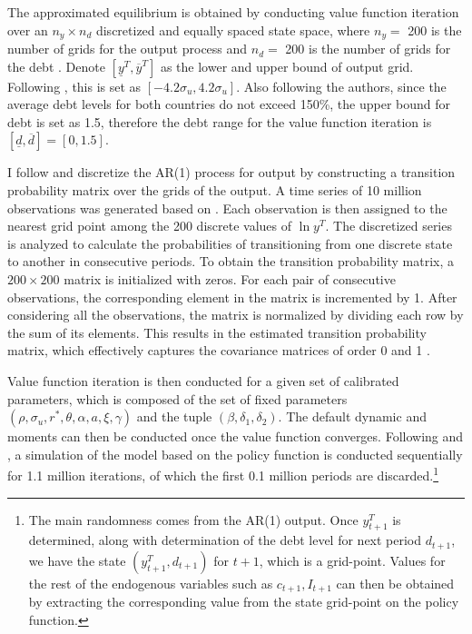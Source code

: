 The approximated equilibrium is obtained by conducting value function iteration over an $n_y \times n_d$ discretized and equally spaced state space,
where $n_y = $ 200 is the number of grids for the output process and $n_d=$ 200 is the number of grids for the debt \citep{Na-18}. Denote $[\underline{y}^T, \overline{y}^T]$ as the lower and upper bound of output grid. Following \citet{Uribe-Schmitt-Grohe-textbook}, this is set as $[-4.2 \sigma_u, 4.2 \sigma_u]$. Also following the authors, since the average debt levels for both countries do not exceed 150\%, the upper bound for debt is set as 1.5, therefore the debt range for the value function iteration is $[\underline{d}, \overline{d}]=[0,1.5]$.

I follow \citet{Schmitt-Uribe-16} and discretize the AR(1) process for output by constructing a transition probability matrix over the grids of the output.
A time series of 10 million observations was generated based on . Each observation is then assigned to the nearest grid point among the 200 discrete values of $\ln y^T$. The discretized series is analyzed to calculate the probabilities of transitioning from one discrete state to another in consecutive periods.
To obtain the transition probability matrix, a $200\times200$ matrix is initialized with zeros. For each pair of consecutive observations, the corresponding element in the matrix is incremented by 1. After considering all the observations, the matrix is normalized by dividing each row by the sum of its elements. This results in the estimated transition probability matrix, which effectively captures the covariance matrices of order 0 and 1
\citep*{Uribe-Schmitt-Grohe-textbook}.

Value function iteration is then conducted for a given set of calibrated parameters, which is composed of the set of fixed parameters $(\rho, \sigma_u, r^*, \theta, \alpha, a, \xi, \gamma)$ and the tuple $(\beta, \delta_1, \delta_2)$. The default dynamic and moments can then be conducted once the value function converges. Following \citet{Uribe-Schmitt-Grohe-textbook} and \citet{Na-18}, a simulation of the model based on the policy function is conducted sequentially for 1.1 million iterations, of which the first 0.1 million periods are discarded.\footnote{
    The main randomness comes from the AR(1) output. Once $y^T_{t+1}$ is determined, along with determination of the debt level for next period $d_{t+1}$, we have the state $(y^T_{t+1}, d_{t+1})$ for $t+1$, which is a grid-point. Values for the rest of the endogenous variables such as $c_{t+1}, I_{t+1}$ can then be obtained by extracting the corresponding value from the state grid-point on the policy function.
}

